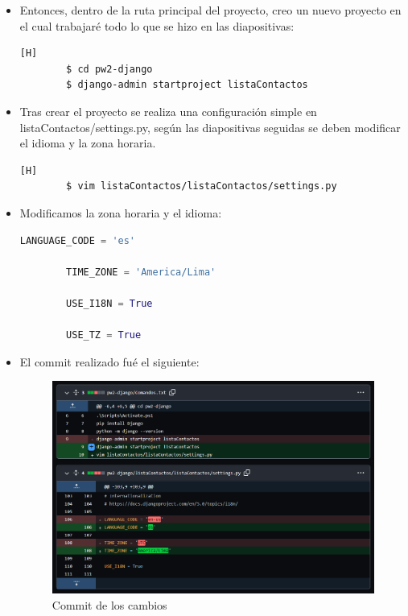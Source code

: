 \documentclass{article}
\begin{document}
        \begin{itemize}
            \item Entonces, dentro de la ruta principal del proyecto, creo un nuevo proyecto en el cual trabajaré todo lo que se hizo en las diapositivas:
             
        \begin{lstlisting}[language=bash,caption={Inicio del proyecto}][H]
        $ cd pw2-django
        $ django-admin startproject listaContactos
        \end{lstlisting}
            
            \item Tras crear el proyecto se realiza una configuración simple en listaContactos/settings.py, según las diapositivas seguidas se deben modificar el idioma y la zona horaria.
            
        \begin{lstlisting}[language=bash,caption={Ingresando a settings.py}][H]
        $ vim listaContactos/listaContactos/settings.py
        \end{lstlisting}
            \item Modificamos la zona horaria y el idioma:

        \begin{lstlisting}[language=Python, caption={Configuración de idioma y zona horaria}]
        LANGUAGE_CODE = 'es'
                    
        TIME_ZONE = 'America/Lima'
                    
        USE_I18N = True
                    
        USE_TZ = True
        \end{lstlisting}

            \item El commit realizado fué el siguiente:

        \begin{figure}[H]
            \centering
            \includegraphics[width=0.7\linewidth]{img/Commit1.png}
            \caption{Commit de los cambios}
            \label{fig:enter-label}
        \end{figure}
        \end{itemize}
\end{document}

